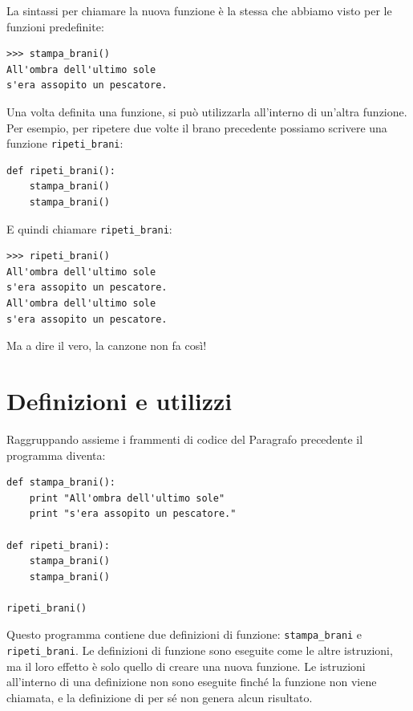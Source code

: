 \documentclass[10pt]{book}
\begin{document}
La sintassi per chiamare la nuova funzione è la stessa che abbiamo visto per le funzioni predefinite:

\begin{verbatim}
>>> stampa_brani()
All'ombra dell'ultimo sole
s'era assopito un pescatore.
\end{verbatim}
%
Una volta definita una funzione, si può utilizzarla all'interno di un'altra funzione. Per esempio, per ripetere due volte il brano precedente possiamo scrivere una funzione \verb"ripeti_brani":

\begin{verbatim}
def ripeti_brani():
    stampa_brani()
    stampa_brani()
\end{verbatim}
%
E quindi chiamare \verb"ripeti_brani":

\begin{verbatim}
>>> ripeti_brani()
All'ombra dell'ultimo sole
s'era assopito un pescatore.
All'ombra dell'ultimo sole
s'era assopito un pescatore.
\end{verbatim}
%
Ma a dire il vero, la canzone non fa così!


\section{Definizioni e utilizzi}

Raggruppando assieme i frammenti di codice del Paragrafo precedente il programma diventa:

\begin{verbatim}
def stampa_brani():
    print "All'ombra dell'ultimo sole"
    print "s'era assopito un pescatore."

def ripeti_brani):
    stampa_brani()
    stampa_brani()

ripeti_brani()
\end{verbatim}
%
Questo programma contiene due definizioni di funzione: \verb"stampa_brani" e
\verb"ripeti_brani".  Le definizioni di funzione sono eseguite come le altre istruzioni, ma il loro effetto è solo quello di creare una nuova funzione. Le istruzioni all'interno di una definizione non sono eseguite finché la funzione non viene chiamata, e la definizione di per sé non genera alcun risultato.
\end{document}
